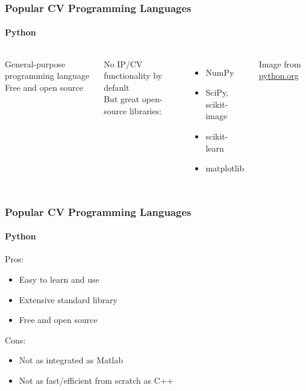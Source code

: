 \documentclass[xetex,professionalfont]{beamer}
\begin{document}

\begin{frame}
\frametitle{Popular CV Programming Languages}
\framesubtitle{Python}

\begin{columns}

General-purpose programming language \\
Free and open source %

\bigskip
No IP/CV functionality by default \\
But great open-source libraries:
\begin{itemize}
	\item NumPy
	\item SciPy, scikit-image %
	\item scikit-learn
	\item matplotlib
\end{itemize}


\begin{center}
{
	{\centering Image from \url{python.org}}}
\end{center}

\end{columns}

\end{frame}


\begin{frame}
\frametitle{Popular CV Programming Languages}
\framesubtitle{Python}

Pros:
\begin{itemize}
	\item Easy to learn and use
	\item Extensive standard library
	\item Free and open source
\end{itemize}

\bigskip
Cons:
\begin{itemize}
	\item Not as integrated as Matlab
	\item Not as fast/efficient from scratch as C++ %
\end{itemize}

\end{frame}
\end{document}
